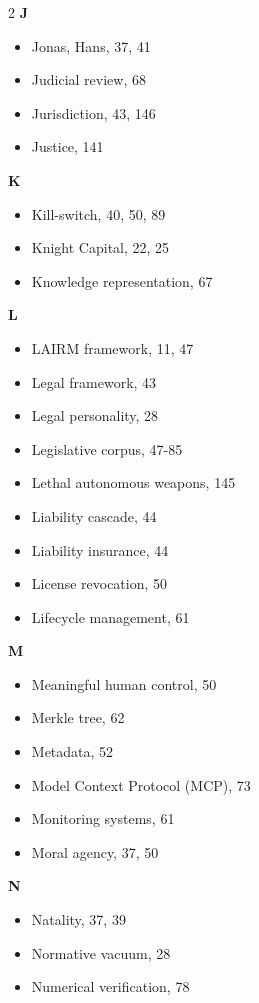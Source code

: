 \begin{multicols}{2}
\textbf{J}
\begin{itemize}[leftmargin=0.5cm]
\item Jonas, Hans, 37, 41
\item Judicial review, 68
\item Jurisdiction, 43, 146
\item Justice, 141
\end{itemize}

\textbf{K}
\begin{itemize}[leftmargin=0.5cm]
\item Kill-switch, 40, 50, 89
\item Knight Capital, 22, 25
\item Knowledge representation, 67
\end{itemize}

\textbf{L}
\begin{itemize}[leftmargin=0.5cm]
\item LAIRM framework, 11, 47
\item Legal framework, 43
\item Legal personality, 28
\item Legislative corpus, 47-85
\item Lethal autonomous weapons, 145
\item Liability cascade, 44
\item Liability insurance, 44
\item License revocation, 50
\item Lifecycle management, 61
\end{itemize}

\textbf{M}
\begin{itemize}[leftmargin=0.5cm]
\item Meaningful human control, 50
\item Merkle tree, 62
\item Metadata, 52
\item Model Context Protocol (MCP), 73
\item Monitoring systems, 61
\item Moral agency, 37, 50
\end{itemize}

\textbf{N}
\begin{itemize}[leftmargin=0.5cm]
\item Natality, 37, 39
\item Normative vacuum, 28
\item Numerical verification, 78
\end{itemize}


\end{multicols}
